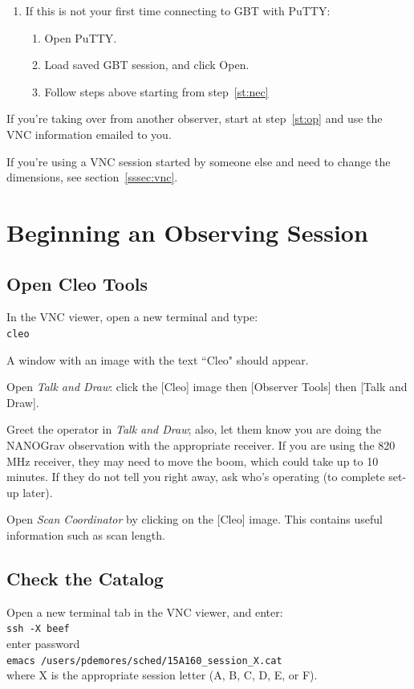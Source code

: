 \documentclass[11pt, reqno, tbtags]{article}
\begin{document}
\begin{enumerate}
 \item If this is not your first time connecting to GBT with PuTTY:
 \begin{enumerate}
  \item Open PuTTY.
  \item Load saved GBT session, and click Open.
  \item Follow steps above starting from step~\ref{st:nec}
 \end{enumerate}
\end{enumerate}

\noindent If you're taking over from another observer, start at step~\ref{st:op} and use the VNC information emailed to you.

\noindent If you're using a VNC session started by someone else and need to change the dimensions, see section~\ref{sssec:vnc}. 



\section{Beginning an Observing Session} \label{sec:begin}  %

\subsection{Open Cleo Tools}\label{ssec:cleo}  %
In the VNC viewer, open a new terminal and type: \\
\indent\texttt{cleo}

\noindent A window with an image with the text ``Cleo" should appear. 

\noindent Open \textit{Talk and Draw}: click the [Cleo] image then [Observer Tools] then [Talk and Draw].

\noindent Greet the operator in \textit{Talk and Draw}; also, let them know you are doing the NANOGrav observation with the appropriate receiver. If you are using the 820\,MHz receiver, they may need to move the boom, which could take up to 10 minutes.  If they do not tell you right away, ask who's operating (to complete set-up later).  

\noindent Open \textit{Scan Coordinator} by clicking on the [Cleo] image.  This contains useful information such as scan length. 

\subsection{Check the Catalog}\label{ssec:cat}  %
Open a new terminal tab in the VNC viewer, and enter: \\
\indent\texttt{ssh -X beef} \\
\indent enter password \\
\indent\texttt{emacs /users/pdemores/sched/15A160\_session\_X.cat} \\
where X is the appropriate session letter (A, B, C, D, E, or F).                                    
\end{document}
